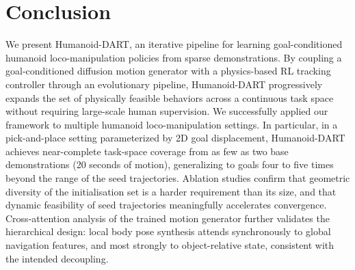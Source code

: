 \documentclass{article}
\newcommand{\papertitle}{Humanoid-DART}
\begin{document}
	


\section{Conclusion}
\label{sec:conclusion}

We present {\papertitle}, an iterative pipeline for learning goal-conditioned 
humanoid loco-manipulation policies from sparse demonstrations. By 
coupling a goal-conditioned diffusion motion generator with a 
physics-based RL tracking controller through an evolutionary pipeline, {\papertitle} progressively expands the set of physically feasible behaviors across a continuous task space without requiring large-scale human supervision. We successfully applied our framework to multiple humanoid loco-manipulation settings. 
%
In particular, in a pick-and-place setting parameterized by 2D goal displacement, 
{\papertitle} achieves near-complete task-space coverage from as few as two 
base demonstrations (20 seconds of motion), generalizing to goals four to five times beyond 
the range of the seed trajectories. Ablation studies confirm that 
geometric diversity of the initialisation set is a harder requirement 
than its size, and that dynamic feasibility of seed trajectories 
meaningfully accelerates convergence. Cross-attention analysis of the 
trained motion generator further validates the hierarchical design: 
local body pose synthesis attends synchronously to global navigation 
features, and most strongly to object-relative state, consistent 
with the intended decoupling.

\end{document}
